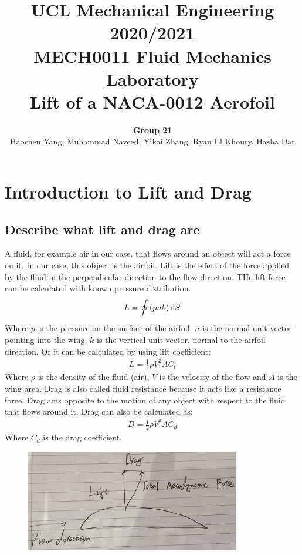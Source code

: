 \documentclass[11pt]{article}
\numberwithin{equation}{section}
\begin{document}
\title{\textbf{UCL Mechanical Engineering 2020/2021}\\MECH0011 Fluid Mechanics Laboratory\\
Lift of a NACA-0012 Aerofoil}
\author{\textbf{Group 21}\\Haochen Yang, Muhammad Naveed, Yikai Zhang, Ryan El Khoury, Hasha Dar}
\maketitle
\section{Introduction to Lift and Drag}
\subsection{Describe what lift and drag are}
A fluid, for example air in our case, that flows around an object will act a force on it. In our case, this object is the airfoil. Lift is the effect of the force applied by the fluid in the perpendicular direction to the flow direction. THe lift force can be calculated with known pressure distribution.
\begin{align}
  L = \oint \left(p n k \right)\dif S
\end{align}
Where $p$ is the pressure on the surface of the airfoil, $n$ is the normal unit vector pointing into the wing, $k$ is the vertical unit vector, normal to the airfoil direction. Or it can be calculated by using lift coefficient:
\begin{align}
  L = \frac{1}{2} \rho V^2 A C_l
\end{align}
Where $\rho$ is the density of the fluid (air), $V$ is the velocity of the flow and $A$ is the wing area. Drag is also called fluid resistance because it acts like a resistance force. Drag acts opposite to the motion of any object with respect to the fluid that flows around it. Drag can also be calculated as:
\begin{align}
  D = \frac{1}{2} \rho V^2 A C_d 
\end{align}
Where $C_d$ is the drag coefficient.
\begin{figure}[H]
  \centering
  \includegraphics[width = 0.5 \textwidth]{./img/diagram1.png}
  \caption{}
\end{figure}
\end{document}
